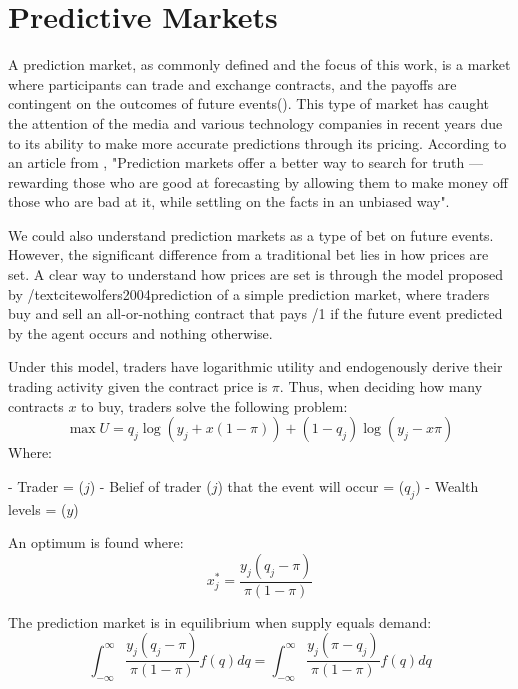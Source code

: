 \section{Predictive Markets}
\label{sec:predictive_markets}

A prediction market, as commonly defined and the focus of this work, is a market where participants can trade and exchange contracts, and the payoffs are contingent on the outcomes of future events(\citeauthor{wolfers2004prediction}). This type of market has caught the attention of the media and various technology companies in recent years due to its ability to make more accurate predictions through its pricing. According to an article from \textcite{Roose_2023}, "Prediction markets offer a better way to search for truth — rewarding those who are good at forecasting by allowing them to make money off those who are bad at it, while settling on the facts in an unbiased way".

We could also understand prediction markets as a type of bet on future events. However, the significant difference from a traditional bet lies in how prices are set. A clear way to understand how prices are set is through the model proposed by  /textcite{wolfers2004prediction}  of a simple prediction market, where traders buy and sell an all-or-nothing contract that pays  /1 if the future event predicted by the agent occurs and nothing otherwise.

Under this model, traders have logarithmic utility and endogenously derive their trading activity given the contract price is \( \pi \). Thus, when deciding how many contracts \( x \) to buy, traders solve the following problem:
\begin{equation}
    \max U = q_j \log(y_j + x(1 - \pi)) + (1 - q_j) \log(y_j - x\pi)
\end{equation}
Where:

- Trader = (\( j \))
- Belief of trader (\( j \)) that the event will occur = (\( q_j \))
- Wealth levels = (\( y \))

An optimum is found where:
\begin{equation}
    x_j^* = \frac{y_j(q_j - \pi)}{\pi(1 - \pi)}
\end{equation}

The prediction market is in equilibrium when supply equals demand:
\begin{equation}
    \int_{-\infty}^{\infty}\frac{y_j(q_j - \pi)}{\pi(1 - \pi)}f(q)dq = \int_{-\infty}^{\infty}\frac{y_j(\pi -q_j)}{\pi(1 - \pi)}f(q)dq
\end{equation}

